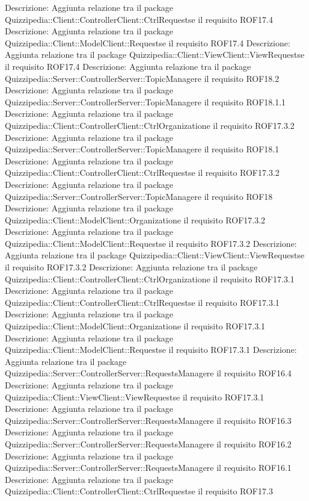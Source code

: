 Descrizione: Aggiunta relazione tra il package Quizzipedia::Client::ControllerClient::CtrlRequestse il requisito ROF17.4 
Descrizione: Aggiunta relazione tra il package Quizzipedia::Client::ModelClient::Requestse il requisito ROF17.4 
Descrizione: Aggiunta relazione tra il package Quizzipedia::Client::ViewClient::ViewRequestse il requisito ROF17.4 
Descrizione: Aggiunta relazione tra il package Quizzipedia::Server::ControllerServer::TopicManagere il requisito ROF18.2 
Descrizione: Aggiunta relazione tra il package Quizzipedia::Server::ControllerServer::TopicManagere il requisito ROF18.1.1 
Descrizione: Aggiunta relazione tra il package Quizzipedia::Client::ControllerClient::CtrlOrganizatione il requisito ROF17.3.2 
Descrizione: Aggiunta relazione tra il package Quizzipedia::Server::ControllerServer::TopicManagere il requisito ROF18.1 
Descrizione: Aggiunta relazione tra il package Quizzipedia::Client::ControllerClient::CtrlRequestse il requisito ROF17.3.2 
Descrizione: Aggiunta relazione tra il package Quizzipedia::Server::ControllerServer::TopicManagere il requisito ROF18 
Descrizione: Aggiunta relazione tra il package Quizzipedia::Client::ModelClient::Organizatione il requisito ROF17.3.2 
Descrizione: Aggiunta relazione tra il package Quizzipedia::Client::ModelClient::Requestse il requisito ROF17.3.2 
Descrizione: Aggiunta relazione tra il package Quizzipedia::Client::ViewClient::ViewRequestse il requisito ROF17.3.2 
Descrizione: Aggiunta relazione tra il package Quizzipedia::Client::ControllerClient::CtrlOrganizatione il requisito ROF17.3.1 
Descrizione: Aggiunta relazione tra il package Quizzipedia::Client::ControllerClient::CtrlRequestse il requisito ROF17.3.1 
Descrizione: Aggiunta relazione tra il package Quizzipedia::Client::ModelClient::Organizatione il requisito ROF17.3.1 
Descrizione: Aggiunta relazione tra il package Quizzipedia::Client::ModelClient::Requestse il requisito ROF17.3.1 
Descrizione: Aggiunta relazione tra il package Quizzipedia::Server::ControllerServer::RequestsManagere il requisito ROF16.4 
Descrizione: Aggiunta relazione tra il package Quizzipedia::Client::ViewClient::ViewRequestse il requisito ROF17.3.1 
Descrizione: Aggiunta relazione tra il package Quizzipedia::Server::ControllerServer::RequestsManagere il requisito ROF16.3 
Descrizione: Aggiunta relazione tra il package Quizzipedia::Server::ControllerServer::RequestsManagere il requisito ROF16.2 
Descrizione: Aggiunta relazione tra il package Quizzipedia::Server::ControllerServer::RequestsManagere il requisito ROF16.1 
Descrizione: Aggiunta relazione tra il package Quizzipedia::Client::ControllerClient::CtrlRequestse il requisito ROF17.3 
